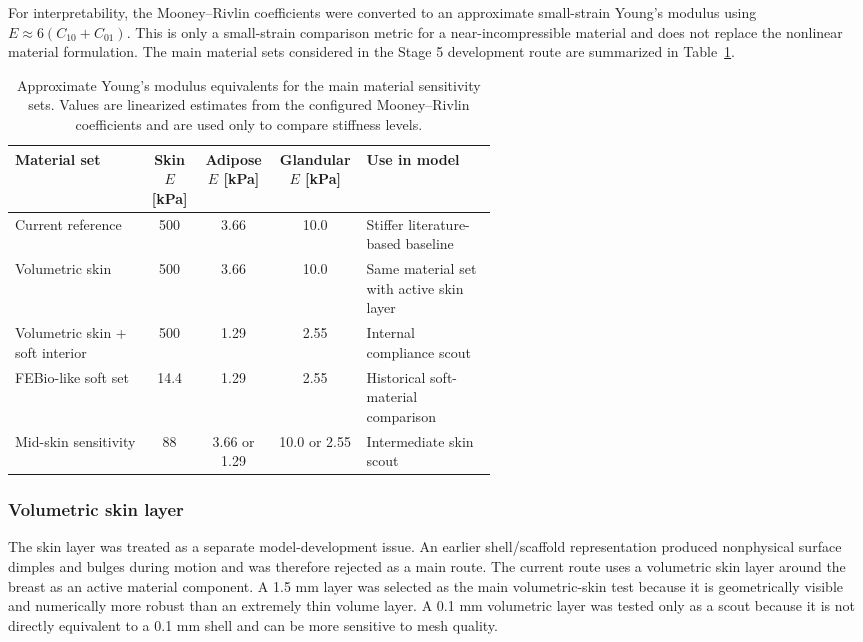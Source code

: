 For interpretability, the Mooney--Rivlin coefficients were converted to an approximate small-strain Young's modulus using \(E \approx 6(C_{10}+C_{01})\). This is only a small-strain comparison metric for a near-incompressible material and does not replace the nonlinear material formulation. The main material sets considered in the Stage 5 development route are summarized in Table~\ref{tab:mm_material_sets}.

\begin{table}[H]
\centering
\caption{Approximate Young's modulus equivalents for the main material sensitivity sets. Values are linearized estimates from the configured Mooney--Rivlin coefficients and are used only to compare stiffness levels.}
\label{tab:mm_material_sets}
\begin{tabular}{p{0.29\linewidth}ccc p{0.27\linewidth}}
\toprule
Material set & Skin \(E\) [kPa] & Adipose \(E\) [kPa] & Glandular \(E\) [kPa] & Use in model \\
\midrule
Current reference & 500 & 3.66 & 10.0 & Stiffer literature-based baseline \\
Volumetric skin & 500 & 3.66 & 10.0 & Same material set with active skin layer \\
Volumetric skin + soft interior & 500 & 1.29 & 2.55 & Internal compliance scout \\
FEBio-like soft set & 14.4 & 1.29 & 2.55 & Historical soft-material comparison \\
Mid-skin sensitivity & 88 & 3.66 or 1.29 & 10.0 or 2.55 & Intermediate skin scout \\
\bottomrule
\end{tabular}
\end{table}

\subsubsection{Volumetric skin layer}

The skin layer was treated as a separate model-development issue. An earlier shell/scaffold representation produced nonphysical surface dimples and bulges during motion and was therefore rejected as a main route. The current route uses a volumetric skin layer around the breast as an active material component. A 1.5 mm layer was selected as the main volumetric-skin test because it is geometrically visible and numerically more robust than an extremely thin volume layer. A 0.1 mm volumetric layer was tested only as a scout because it is not directly equivalent to a 0.1 mm shell and can be more sensitive to mesh quality.

